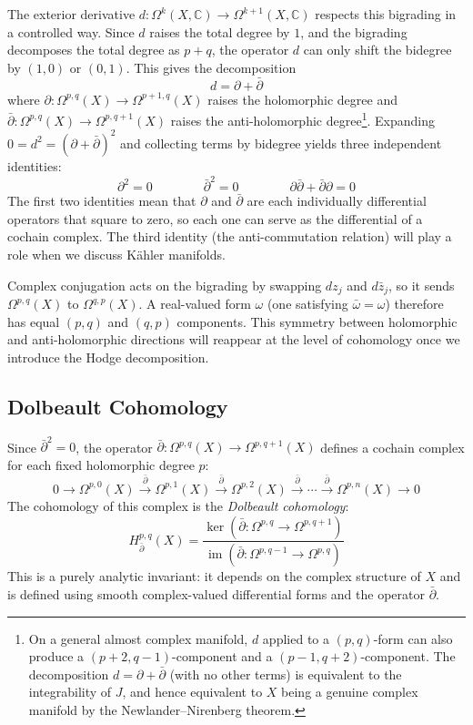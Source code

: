 \documentclass{article}
\newcommand{\C}{\mathbb{C}}
\newcommand{\im}{\operatorname{im}}
\begin{document}
The exterior derivative $d: \Omega^k(X, \C) \to \Omega^{k+1}(X, \C)$ respects
this bigrading in a controlled way. Since $d$ raises the total degree by $1$,
and the bigrading decomposes the total degree as $p + q$, the operator $d$
can only shift the bidegree by $(1,0)$ or $(0,1)$. This gives the
decomposition
\[
  d = \partial + \bar{\partial}
\]
where $\partial: \Omega^{p,q}(X) \to \Omega^{p+1,q}(X)$ raises the
holomorphic degree and $\bar{\partial}: \Omega^{p,q}(X) \to
\Omega^{p,q+1}(X)$ raises the anti-holomorphic
degree\footnote{On a general almost complex manifold, $d$ applied to a
$(p,q)$-form can also produce a $(p+2, q-1)$-component and a
$(p-1, q+2)$-component. The decomposition $d = \partial + \bar\partial$
(with no other terms) is equivalent to the integrability of $J$, and hence
equivalent to $X$ being a genuine complex manifold by the
Newlander--Nirenberg theorem.}.
Expanding $0 = d^2 = (\partial + \bar\partial)^2$ and collecting terms by
bidegree yields three independent identities:
\[
  \partial^2 = 0 \qquad\qquad
  \bar\partial^2 = 0 \qquad\qquad
  \partial\bar\partial + \bar\partial\partial = 0
\]
The first two identities mean that $\partial$ and $\bar\partial$ are each
individually differential operators that square to zero, so each one can serve
as the differential of a cochain complex. The third identity (the
anti-commutation relation) will play a role when we discuss Kähler manifolds.

Complex conjugation acts on the bigrading by swapping $dz_j$ and
$d\bar{z}_j$, so it sends $\Omega^{p,q}(X)$ to $\Omega^{q,p}(X)$. A
real-valued form $\omega$ (one satisfying $\bar\omega = \omega$) therefore has
equal $(p,q)$ and $(q,p)$ components. This symmetry between holomorphic and
anti-holomorphic directions will reappear at the level of cohomology once we
introduce the Hodge decomposition.

\subsection{Dolbeault Cohomology}\label{subsec:dolbeault}

Since $\bar\partial^2 = 0$, the operator
$\bar\partial: \Omega^{p,q}(X) \to \Omega^{p,q+1}(X)$ defines a cochain
complex for each fixed holomorphic degree $p$:
\[
  0 \longrightarrow \Omega^{p,0}(X) \xrightarrow{\;\bar\partial\;}
    \Omega^{p,1}(X) \xrightarrow{\;\bar\partial\;} \Omega^{p,2}(X)
    \xrightarrow{\;\bar\partial\;} \cdots \xrightarrow{\;\bar\partial\;}
    \Omega^{p,n}(X) \longrightarrow 0
\]
The cohomology of this complex is the \emph{Dolbeault cohomology}:
\[
  H^{p,q}_{\bar\partial}(X) =
    \frac{\ker(\bar\partial: \Omega^{p,q} \to \Omega^{p,q+1})}
         {\im(\bar\partial: \Omega^{p,q-1} \to \Omega^{p,q})}
\]
This is a purely analytic invariant: it depends on the complex structure of $X$
and is defined using smooth complex-valued differential forms and the operator
$\bar\partial$.
\end{document}
